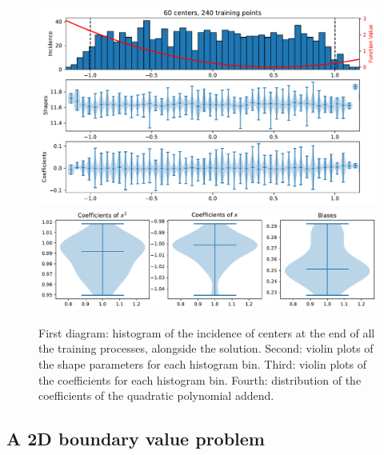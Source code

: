 \documentclass[12pt]{report} %
\begin{document}
\begin{figure}
  \includegraphics[width=\textwidth]{imagenes/experiments/1d/ode/C60-TR240-poly2.pdf}
  \includegraphics[width=\textwidth]{imagenes/experiments/1d/ode/histogram_of_coefficients.pdf}
  \caption{First diagram: histogram of the incidence of centers at the end of all the training processes, alongside the solution. Second: violin plots of the shape parameters for each histogram bin. Third: violin plots of the coefficients for each histogram bin. Fourth: distribution of the coefficients of the quadratic polynomial addend.}
  \label{fig:tripleplot-ode-poly2}
\end{figure}

\clearpage

\subsection*{A 2D boundary value problem}
\end{document}
